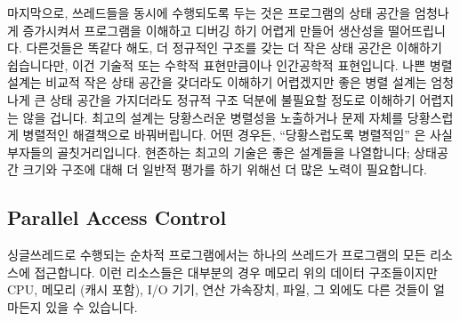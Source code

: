 마지막으로, 쓰레드들을 동시에 수행되도록 두는 것은 프로그램의 상태 공간을
엄청나게 증가시켜서 프로그램을 이해하고 디버깅 하기 어렵게 만들어 생산성을
떨어뜨립니다.
다른것들은 똑같다 해도, 더 정규적인 구조를 갖는 더 작은 상태 공간은 이해하기
쉽습니다만, 이건 기술적 또는 수학적 표현만큼이나 인간공학적 표현입니다.
나쁜 병렬 설계는 비교적 작은 상태 공간을 갖더라도 이해하기 어렵겠지만 좋은 병렬
설계는 엄청나게 큰 상태 공간을 가지더라도 정규적 구조 덕분에 불필요할 정도로
이해하기 어렵지는 않을 겁니다.
최고의 설계는 당황스러운 병렬성을 노출하거나 문제 자체를 당황스럽게 병렬적인
해결책으로 바꿔버립니다.
어떤 경우든, ``당황스럽도록 병렬적임'' 은 사실 부자들의 골칫거리입니다.
현존하는 최고의 기술은 좋은 설계들을 나열합니다; 상태공간 크기와 구조에 대해 더
일반적 평가를 하기 위해선 더 많은 노력이 필요합니다.

\subsection{Parallel Access Control}
\label{sec:Parallel Access Control}

싱글쓰레드로 수행되는 순차적 프로그램에서는 하나의 쓰레드가 프로그램의 모든
리소스에 접근합니다.
이런 리소스들은 대부분의 경우 메모리 위의 데이터 구조들이지만 CPU, 메모리 (캐시
포함), I/O 기기, 연산 가속장치, 파일, 그 외에도 다른 것들이 얼마든지 있을 수
있습니다.

